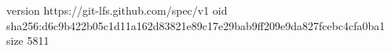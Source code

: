 version https://git-lfs.github.com/spec/v1
oid sha256:d6c9b422b05c1d11a162d83821e89c17e29bab9ff209e9da827fcebc4cfa0ba1
size 5811
